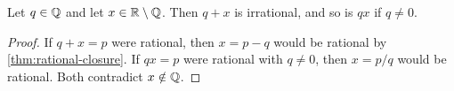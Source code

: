 \begin{theorem}\label{thm:rational-plus-irrational}
  Let $q \in \mathbb{Q}$ and let $x \in \mathbb{R} \setminus \mathbb{Q}$. Then $q + x$ is irrational,
  and so is $qx$ if $q \neq 0$.
\end{theorem}

\begin{proof}
  If $q + x = p$ were rational, then $x = p - q$ would be rational by
  \cref{thm:rational-closure}. If $qx = p$ were rational with $q \neq 0$,
  then $x = p / q$ would be rational. Both contradict $x \notin \mathbb{Q}$.
\end{proof}
